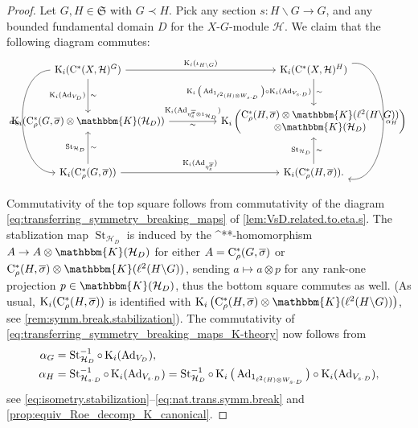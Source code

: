 \documentclass{amsart}
\numberwithin{figure}{section}
\numberwithin{equation}{section}
\numberwithin{table}{section}
\theoremstyle{plain}
\theoremstyle{definition}
\theoremstyle{remark}
\theoremstyle{nonumber}
\newcommand{\Cpt}{\mathbb{K}}
\newcommand{\K}{\relax\ifmmode\operatorname{K}\else\textup{K}\fi}
\newcommand{\st}{\relax\ifmmode{}^*\else{}\textup{*}\fi}
\newcommand{\Cst}{\relax\ifmmode\mathrm{C}^*\else\textup{C*}\fi}
\newcommand{\Cstr}{\Cst_\rho} %
\newcommand{\Stab}{\operatorname{St}} %
\newcommand{\Ad}{\operatorname{Ad}} %
\renewcommand{\mathbb}{\mathbbm} %
\begin{document}
\begin{proof}
Let \( G,H\in\mathfrak{S} \) with \( G\prec H \). Pick any section $s\colon H\backslash G\to G$, and any bounded fundamental domain $D$ for the $X$-$G$-module $\mathcal{H}$.
We claim that the following diagram commutes:
\begin{equation}\label{eq:transferring_symmetry_breaking_maps_K-theory}
\begin{tikzcd}[row sep=large, column sep=huge]
\K_i(\Cst(X,\mathcal{H})^G) \arrow[r, "\K_i(\iota_{H\backslash G})"]
\arrow[d, "\K_i(\Ad_{V_D})"', "\sim"] \arrow[dd, bend right=90,
"\alpha_G"'] &
\K_i(\Cst(X,\mathcal{H})^H)
\arrow[d, "\K_i\big(\Ad_{1_{\ell^2(H)\otimes W_{s\cdot D}}}\big)\circ \K_i(\Ad_{V_{s\cdot
D}})"', "\sim"] \arrow[dd, bend left=100, "\alpha_H"] \\ 
\K_i(\Cstr(G,\overline{\sigma})\otimes\Cpt(\mathcal{H}_D)) \arrow[r, "\K_i(\Ad_{\eta_s^{\overline{\sigma}}\otimes
1_{\mathcal{H}_D}})", "\sim"'] &
\K_i\left(\begin{matrix}
\Cstr(H,\overline{\sigma})\otimes\Cpt(\ell^2(H\backslash G))\\
\otimes\Cpt(\mathcal{H}_D)
\end{matrix}\right)\\
\K_i(\Cstr(G,\overline{\sigma})) \arrow[u, "\Stab_{\mathcal{H}_D}", "\sim"'] \arrow[r, "\K_i(\Ad_{\eta_s^{\overline{\sigma}}})"] &
\K_i(\Cstr(H,\overline{\sigma})) \arrow[u, "\Stab_{\mathcal{H}_D}", "\sim"'].
\end{tikzcd} 
\end{equation}
Commutativity of the top square follows from
commutativity of the diagram
\eqref{eq:transferring_symmetry_breaking_maps} of \cref{lem:VsD.related.to.eta.s}. The stablization map \(
\Stab_{\mathcal{H}_D} \) is induced by the \st-homomorphism 
\( A\to A\otimes\Cpt(\mathcal{H}_D) \) for either \( A=\Cstr(G,\overline{\sigma}) \) or \(
\Cstr(H,\overline{\sigma})\otimes\Cpt(\ell^2(H\backslash G)) \),
sending \( a\mapsto a\otimes p \)
for any rank-one projection \( p\in\Cpt(\mathcal{H}_D) \), thus the bottom
square commutes as well. (As usual, \( \K_i(\Cstr(H,\overline{\sigma})) \) is identified with \(
\K_i\big(\Cstr(H,\overline{\sigma})\otimes\Cpt(\ell^2(H\backslash G))\big) \), see \cref{rem:symm.break.stabilization}). 
The commutativity of
\eqref{eq:transferring_symmetry_breaking_maps_K-theory} now follows from
\begin{align*}
\alpha_G&=\Stab_{\mathcal{H}_D}^{-1}\circ\K_i(\Ad_{V_D}), \\
\alpha_H&=\Stab_{\mathcal{H}_{s\cdot D}}^{-1}\circ\K_i(\Ad_{V_{s\cdot D}})=\Stab_{\mathcal{H}_D}^{-1}\circ \K_i\big(\Ad_{1_{\ell^2(H)\otimes W_{s\cdot D}}}\big) \circ\K_i(\Ad_{V_{s\cdot D}}),
\end{align*}
see \eqref{eq:isometry.stabilization}--\eqref{eq:nat.trans.symm.break} and
\cref{prop:equiv_Roe_decomp_K_canonical}.


\end{proof}
\end{document}
